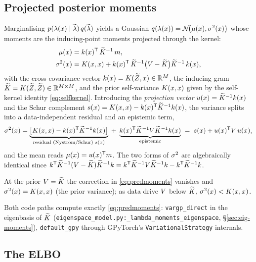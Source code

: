 \subsection{Projected posterior moments}\label{sec:predmoments}

Marginalising $p(\lambda(x)\mid\widetilde{\lambda})\,q(\widetilde{\lambda})$ yields a Gaussian
$q(\lambda(x))=\mathcal{N}\!\big(\mu(x),\sigma^{2}(x)\big)$ whose moments are the
inducing-point moments projected through the kernel:
\begin{align}
  \mu(x)  &= k(x)^{\mathsf{T}}\,\widetilde{K}^{-1}\,m , \notag\\
  \sigma^{2}(x)   &= K(x,x) + k(x)^{\mathsf{T}}\,\widetilde{K}^{-1}\big(V-\widetilde{K}\big)\widetilde{K}^{-1}\,k(x),
  \label{eq:predmoments}
\end{align}
with the cross-covariance vector $k(x)=K(\widetilde{Z},x)\in\mathbb{R}^{M}$, the
inducing gram $\widetilde{K}=K(\widetilde{Z},\widetilde{Z})\in\mathbb{R}^{M\times M}$, and the prior
self-variance $K(x,x)$ given by the self-kernel identity \eqref{eq:selfkernel}.
Introducing the \emph{projection vector} $u(x)=\widetilde{K}^{-1}k(x)$ and the
Schur complement $s(x)=K(x,x)-k(x)^{\mathsf{T}}\widetilde{K}^{-1}k(x)$, the
variance splits into a data-independent residual and an epistemic term,
\begin{equation}
  \sigma^{2}(x)=\underbrace{\big[K(x,x)-k(x)^{\mathsf{T}}\widetilde{K}^{-1}k(x)\big]}_{\text{residual (Nystr\"om/Schur) }s(x)}
    \;+\;\underbrace{k(x)^{\mathsf{T}}\widetilde{K}^{-1}V\widetilde{K}^{-1}k(x)}_{\text{epistemic}}
    \;=\; s(x)+u(x)^{\mathsf{T}}V\,u(x),
  \label{eq:varsplit}
\end{equation}
and the mean reads $\mu(x)=u(x)^{\mathsf{T}}m$. The two forms of $\sigma^{2}$ are
algebraically identical since
$k^{\mathsf{T}}\widetilde{K}^{-1}(V-\widetilde{K})\widetilde{K}^{-1}k=k^{\mathsf{T}}\widetilde{K}^{-1}V\widetilde{K}^{-1}k-k^{\mathsf{T}}\widetilde{K}^{-1}k$.

\begin{remark}
At the prior $V=\widetilde{K}$ the correction in \eqref{eq:predmoments} vanishes and
$\sigma^{2}(x)=K(x,x)$ (the prior variance); as data drive $V$ below $\widetilde{K}$,
$\sigma^{2}(x)<K(x,x)$.
\end{remark}

Both code paths compute exactly \eqref{eq:predmoments}:
\texttt{vargp\_direct} in the eigenbasis of $\widetilde{K}$
(\texttt{eigenspace\_model.py:\allowbreak \_lambda\_moments\_eigenspace}, \S\ref{sec:eig-moments}),
\texttt{default\_gpy} through GPyTorch's \texttt{VariationalStrategy} internals.

\subsection{The ELBO}\label{sec:elbo}

